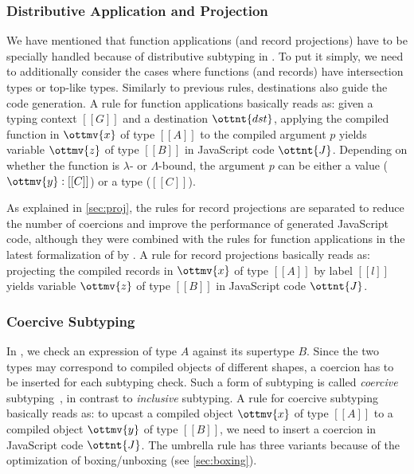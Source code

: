 {\small\ottdefncompile{}}

\subsubsection{Distributive Application and Projection}

We have mentioned that function applications (and record projections) have to be
specially handled because of distributive subtyping in \fiplus. To put it
simply, we need to additionally consider the cases where functions (and records)
have intersection types or top-like types. Similarly to previous rules,
destinations also guide the code generation. A rule for function applications
basically reads as: given a typing context $[[G]]$ and a destination
$\ottnt{dst}$, applying the compiled function in $\ottmv{x}$ of type $[[A]]$ to
the compiled argument $p$ yields variable $\ottmv{z}$ of type $[[B]]$ in
JavaScript code $\ottnt{J}$. Depending on whether the function is $\lambda$- or
$\Lambda$-bound, the argument $p$ can be either a value ($\ottmv{y} : [[C]]$) or
a type ($[[C]]$).

{\small\ottdefndapp{}}

\noindent
As explained in \autoref{sec:proj}, the rules for record projections are
separated to reduce the number of coercions and improve the performance of
generated JavaScript code, although they were combined with the rules for
function applications in the latest formalization of \fiplus by
\citet{fan2022direct}. A rule for record projections basically reads as:
projecting the compiled records in $\ottmv{x}$ of type $[[A]]$ by label $[[l]]$
yields variable $\ottmv{z}$ of type $[[B]]$ in JavaScript code $\ottnt{J}$.

{\small\ottdefndproj{}}

\subsubsection{Coercive Subtyping}

In , we check an expression of type $A$ against its supertype $B$.
Since the two types may correspond to compiled objects of different shapes, a
coercion has to be inserted for each subtyping check. Such a form of subtyping
is called \emph{coercive} subtyping~\citep{luo2013coercive}, in contrast to
\emph{inclusive} subtyping. A rule for coercive subtyping basically reads as: to
upcast a compiled object $\ottmv{x}$ of type $[[A]]$ to a compiled object
$\ottmv{y}$ of type $[[B]]$, we need to insert a coercion in JavaScript code
$\ottnt{J}$. The umbrella rule has three variants because of the optimization of
boxing/unboxing (see \autoref{sec:boxing}).

